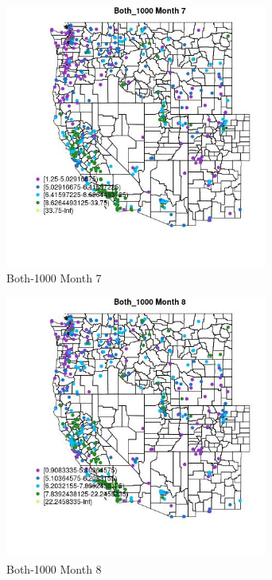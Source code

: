 \begin{figure} 
\centering  
\includegraphics[width=0.77\textwidth]{Code_Outputs/ML_input_report_ML_input_PM25_Step5_part_d_de_duplicated_aves_ML_input_MapObsMo7Both_1000.jpg} 
\caption{\label{fig:ML_input_report_ML_input_PM25_Step5_part_d_de_duplicated_aves_ML_inputMapObsMo7Both_1000}Both-1000 Month 7} 
\end{figure} 
 

\begin{figure} 
\centering  
\includegraphics[width=0.77\textwidth]{Code_Outputs/ML_input_report_ML_input_PM25_Step5_part_d_de_duplicated_aves_ML_input_MapObsMo8Both_1000.jpg} 
\caption{\label{fig:ML_input_report_ML_input_PM25_Step5_part_d_de_duplicated_aves_ML_inputMapObsMo8Both_1000}Both-1000 Month 8} 
\end{figure} 
 

